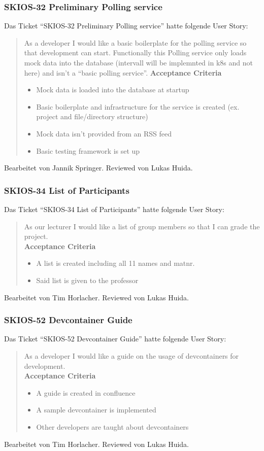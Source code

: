 \subsubsection{SKIOS-32 Preliminary Polling service}
Das Ticket \enquote{SKIOS-32 Preliminary Polling service} hatte folgende User Story:
\begin{quotation}
    As a developer I would like a basic boilerplate for the polling service so that development can start.
    Functionally this Polling service only loads mock data into the database (intervall will be implemnted in k8s and not here) and isn't a \enquote{basic polling service}.
\textbf{Acceptance Criteria}
\begin{itemize}
    \item Mock data is loaded into the database at startup
    \item Basic boilerplate and infrastructure for the service is created (ex. project and file/directory structure)
    \item Mock data isn't provided from an RSS feed 
    \item Basic testing framework is set up
\end{itemize}
\end{quotation}
Bearbeitet von Jannik Springer.
Reviewed von Lukas Huida.

\subsubsection{SKIOS-34 List of Participants}
Das Ticket \enquote{SKIOS-34 List of Participants} hatte folgende User Story:
\begin{quotation}
    As our lecturer I would like a list of group members so that I can grade the project. \\
    \textbf{Acceptance Criteria}
    \begin{itemize}
        \item A list is created including all 11 names and matnr.
        \item Said list is given to the professor
    \end{itemize}
\end{quotation}
Bearbeitet von Tim Horlacher.
Reviewed von Lukas Huida.

\subsubsection{SKIOS-52 Devcontainer Guide}
Das Ticket \enquote{SKIOS-52 Devcontainer Guide} hatte folgende User Story:
\begin{quotation}
    As a developer I would like a guide on the usage of devcontainers for development. \\
    \textbf{Acceptance Criteria}
    \begin{itemize}
        \item A guide is created in confluence
        \item A sample devcontainer is implemented
        \item Other developers are taught about devcontainers 
    \end{itemize}
\end{quotation}
Bearbeitet von Tim Horlacher.
Reviewed von Lukas Huida.

